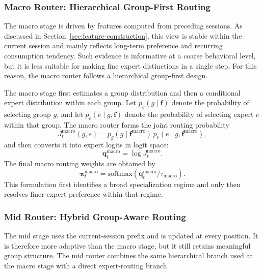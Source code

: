 \documentclass[sigconf,anonymous,review]{acmart}
\begin{document}
\subsubsection{Macro Router: Hierarchical Group-First Routing}

The macro stage is driven by features computed from preceding sessions. As discussed in Section~\ref{sec:feature-construction}, this view is stable within the current session and mainly reflects long-term preference and recurring consumption tendency. Such evidence is informative at a coarse behavioral level, but it is less suitable for making fine expert distinctions in a single step. For this reason, the macro router follows a hierarchical group-first design.

The macro stage first estimates a group distribution and then a conditional expert distribution within each group. Let $p_g(g \mid \mathbf{f})$ denote the probability of selecting group $g$, and let $p_e(e \mid g, \mathbf{f})$ denote the probability of selecting expert $e$ within that group. The macro router forms the joint routing probability
\[
J_t^{\mathrm{macro}}(g,e) = p_g(g \mid \mathbf{f}^{\mathrm{macro}})\,p_e(e \mid g, \mathbf{f}^{\mathrm{macro}}),
\]
and then converts it into expert logits in logit space:
\[
\mathbf{q}_t^{\mathrm{macro}} = \log J_t^{\mathrm{macro}}.
\]
The final macro routing weights are obtained by
\[
\boldsymbol{\pi}^{\mathrm{macro}}_t = \mathrm{softmax}\!\left(\mathbf{q}_t^{\mathrm{macro}} / \tau_{\mathrm{macro}}\right).
\]
This formulation first identifies a broad specialization regime and only then resolves finer expert preference within that regime.

\subsubsection{Mid Router: Hybrid Group-Aware Routing}

The mid stage uses the current-session prefix and is updated at every position. It is therefore more adaptive than the macro stage, but it still retains meaningful group structure. The mid router combines the same hierarchical branch used at the macro stage with a direct expert-routing branch.
\end{document}
